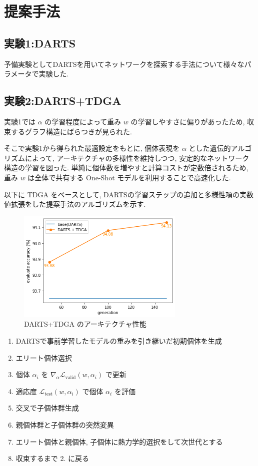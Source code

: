 \documentclass[a4paper,twoside,twocolumn,10pt]{article}
\begin{document}
\section{提案手法}
\subsection{実験1:DARTS}
予備実験としてDARTSを用いてネットワークを探索する手法について様々なパラメータで実験した.

\subsection{実験2:DARTS+TDGA}

実験1では $\alpha$ の学習程度によって重み $w$ の学習しやすさに偏りがあったため,
収束するグラフ構造にばらつきが見られた.

そこで実験1から得られた最適設定をもとに,
個体表現を $\alpha$ とした遺伝的アルゴリズムによって,
アーキテクチャの多様性を維持しつつ, 安定的なネットワーク構造の学習を図った.
単純に個体数を増やすと計算コストが定数倍されるため,
重み $w$ は全体で共有する One-Shot モデルを利用することで高速化した.

以下に TDGA をベースとして, DARTSの学習ステップの追加と多様性項の実数値拡張をした提案手法のアルゴリズムを示す.

\begin{figure}[t]
  \centering
  \includegraphics[width=80mm]{eval_tdga.png}
  \caption{DARTS+TDGA のアーキテクチャ性能}
  \label{fig:eval_tdga}
\end{figure}

\begin{enumerate}
  \item DARTSで事前学習したモデルの重みを引き継いだ初期個体を生成
  \item エリート個体選択
  \item 個体 $\alpha_i$ を $\displaystyle \nabla_\alpha \mathcal{L}_{\mathrm{valid}}(w, \alpha_i)$ で更新
  \item 適応度 $\displaystyle \mathcal{L}_{\mathrm{test}}(w, \alpha_i)$ で個体 $\alpha_i$ を評価
  \item 交叉で子個体群生成
  \item 親個体群と子個体群の突然変異
  \item エリート個体と親個体, 子個体に熱力学的選択をして次世代とする
  \item 収束するまで 2. に戻る
\end{enumerate}
\end{document}
